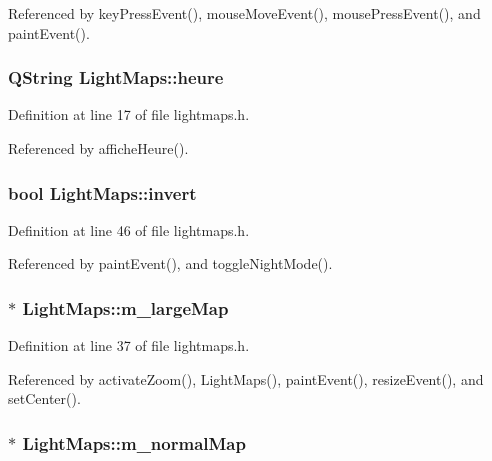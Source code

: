 Referenced by key\-Press\-Event(), mouse\-Move\-Event(), mouse\-Press\-Event(), and paint\-Event().

\hypertarget{classLightMaps_a3bffc587b77f94dadef10a63ba9b627e}{
\subsubsection[{heure}]{\setlength{\rightskip}{0pt plus 5cm}Q\-String Light\-Maps\-::heure}}\label{classLightMaps_a3bffc587b77f94dadef10a63ba9b627e}


Definition at line 17 of file lightmaps.\-h.



Referenced by affiche\-Heure().

\hypertarget{classLightMaps_af4784df46ac3c6cf085e48811cc367b6}{
\subsubsection[{invert}]{\setlength{\rightskip}{0pt plus 5cm}bool Light\-Maps\-::invert\hspace{0.3cm}{\ttfamily [private]}}}\label{classLightMaps_af4784df46ac3c6cf085e48811cc367b6}


Definition at line 46 of file lightmaps.\-h.



Referenced by paint\-Event(), and toggle\-Night\-Mode().

\hypertarget{classLightMaps_a46a1d64c4860e7bdeec5d3dc23b5b66a}{
\subsubsection[{m\-\_\-large\-Map}]{$\ast$ Light\-Maps\-::m\-\_\-large\-Map\hspace{0.3cm}{\ttfamily [private]}}}\label{classLightMaps_a46a1d64c4860e7bdeec5d3dc23b5b66a}


Definition at line 37 of file lightmaps.\-h.



Referenced by activate\-Zoom(), Light\-Maps(), paint\-Event(), resize\-Event(), and set\-Center().

\hypertarget{classLightMaps_a62539ec15fdc3559461cfa5b80ed3f84}{
\subsubsection[{m\-\_\-normal\-Map}]{$\ast$ Light\-Maps\-::m\-\_\-normal\-Map\hspace{0.3cm}{\ttfamily [private]}}}\label{classLightMaps_a62539ec15fdc3559461cfa5b80ed3f84}


